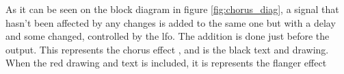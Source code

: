 As it can be seen on the block diagram in figure \autoref{fig:chorus_diag}, a signal that hasn't been affected by any changes is added to the same one but with a delay and some changed, controlled by the \gls{lfo}. The addition is done just before the output. This represents the chorus effect \citep{chorus_projectpaper}, and is the black text and drawing. When the red drawing and text is included, it is represents the flanger effect  \\









